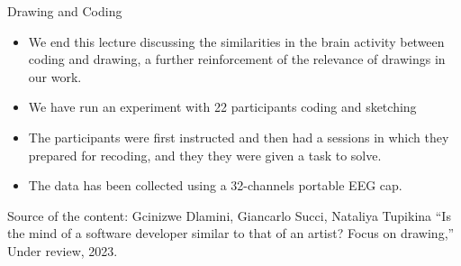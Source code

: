 \documentclass{beamer}
\begin{document}
\begin{frame}
{\centerline{Drawing and Coding}}
\begin{itemize}
\item We end this lecture discussing the similarities in the brain activity between coding and drawing, a further reinforcement of the relevance of drawings in our work.
\item We have run an experiment with 22 participants coding and sketching
\item The participants were first instructed and then had a sessions in which they prepared for recoding, and they they were given a task to solve.
\item The data has been collected using a 32-channels portable EEG cap.
\end{itemize} 

\begin{center}
\tiny
Source of the content: Gcinizwe Dlamini, Giancarlo Succi, Nataliya Tupikina ``Is the mind of a software developer similar to that of an artist? Focus on drawing,'' Under review, 2023.
\end{center}
\end{frame}
\end{document}
